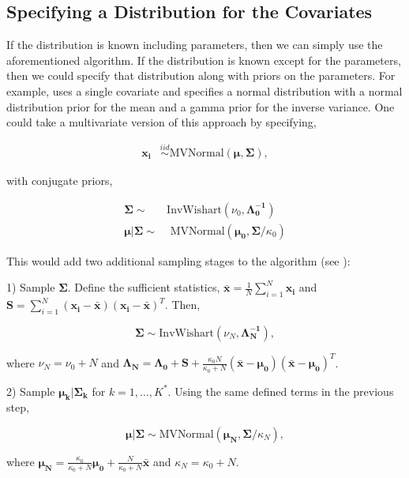 \documentclass[
  12pt,
]{article}
\begin{document}
\subsection{Specifying a Distribution for the Covariates}
\label{sec:normaldistributioncovariate}

If the distribution is known including parameters, then we can simply
use the aforementioned algorithm. If the distribution is known except
for the parameters, then we could specify that distribution along with
priors on the parameters. For example, \cite{royle_analysis_2009} uses a
single covariate and specifies a normal distribution with a normal
distribution prior for the mean and a gamma prior for the inverse
variance. One could take a multivariate version of this approach by
specifying,

\begin{align} 
\label{eqn:normalcovariatedistribution}
\boldsymbol{x_{i}} & \stackrel{iid}{\sim} \text{MVNormal}(\boldsymbol{\mu},\boldsymbol{\Sigma}),
\end{align}

with conjugate priors,

\begin{align}
\boldsymbol{\Sigma} \sim & \text{InvWishart}(\nu_{0},\boldsymbol{\Lambda_{0}^{-1}}) \\
\boldsymbol{\mu}|\boldsymbol{\Sigma} \sim & \text{ MVNormal}(\boldsymbol{\mu_{0}},\boldsymbol{\Sigma}/\kappa_{0})
\end{align}

This would add two additional sampling stages to the algorithm (see
\cite{gelman_bayesian_2014}):

\begin{list}{}{}
\item[1)] Sample $\boldsymbol{\Sigma}$.  Define the sufficient statistics, $\boldsymbol{\bar{x}}=\frac{1}{N}\sum_{i=1}^{N}\boldsymbol{x_{i}}$ and $\boldsymbol{S} = \sum_{i=1}^{N}(\boldsymbol{x_{i}}-\boldsymbol{\bar{x}})(\boldsymbol{x_{i}}-\boldsymbol{\bar{x}})^T$.  Then,

\begin{equation}
\boldsymbol{\Sigma} \sim \text{InvWishart}(\nu_{N},\boldsymbol{\Lambda_{N}^{-1}}),
\end{equation}

where $\nu_{N} = \nu_{0}+N$ and $\boldsymbol{\Lambda_{N}}=\boldsymbol{\Lambda_{0}}+\boldsymbol{S}+\frac{\kappa_{0}N}{\kappa_{0}+N}(\boldsymbol{\bar{x}}-\boldsymbol{\mu_{0}})(\boldsymbol{\bar{x}}-\boldsymbol{\mu_{0}})^T$.

\item[2)] Sample $\boldsymbol{\mu_k|\Sigma_k}$ for $k=1,...,K^*$.  Using the same defined terms in the previous step,

\begin{equation}
\boldsymbol{\mu}|\boldsymbol{\Sigma} \sim \text{MVNormal}(\boldsymbol{\mu_{N}},\boldsymbol{\Sigma}/\kappa_{N} ),
\end{equation}

where $\boldsymbol{\mu_{N}}=\frac{\kappa_{0}}{\kappa_{0}+N}\boldsymbol{\mu_{0}} + \frac{N}{\kappa_{0}+N}\boldsymbol{\bar{x}} $ and $\kappa_{N}=\kappa_{0}+N$.
\end{list}
\end{document}
